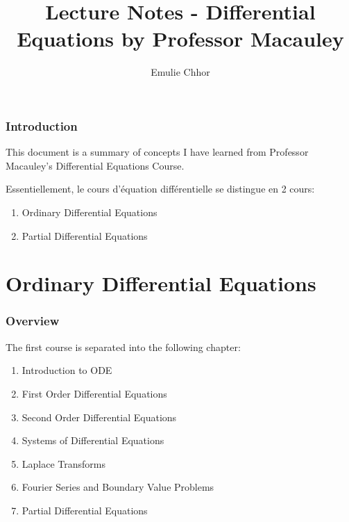 \documentclass{article}
\begin{document}
\title{Lecture Notes - Differential Equations by Professor Macauley}
\author{Emulie Chhor}
\maketitle

\section*{Introduction}

This document is a summary of concepts I have learned from Professor
Macauley's Differential Equations Course.

Essentiellement, le cours d'équation différentielle se distingue
en 2 cours:
\begin{enumerate}
    \item Ordinary Differential Equations
    \item Partial Differential Equations
\end{enumerate}

\pagebreak

\part{Ordinary Differential Equations} %
\label{prt:Differential Equations}

\section{Overview}%
\label{sec:Overview}


The first course is separated into the following chapter:
\begin{enumerate}
    \item Introduction to ODE
    \item First Order Differential Equations
    \item Second Order Differential Equations
    \item Systems of Differential Equations
    \item Laplace Transforms
    \item Fourier Series and Boundary Value Problems
    \item Partial Differential Equations
\end{enumerate}

\newtheorem{definition}{Definition}[subsection]
\newtheorem{theorem}{Theorem}[subsection]
\newtheorem{corollary}{Corollary}[subsection]
\newtheorem{lemma}[theorem]{Lemma}
\newtheorem{proposition}{Proposition}[section]
\newtheorem{axiom}{Axiome}
\newtheorem{property}{Propriété}[subsection]
\newtheorem*{remark}{Remarque}
\newtheorem*{problem}{Problème}
\newtheorem*{intuition}{Intuition}
\end{document}
